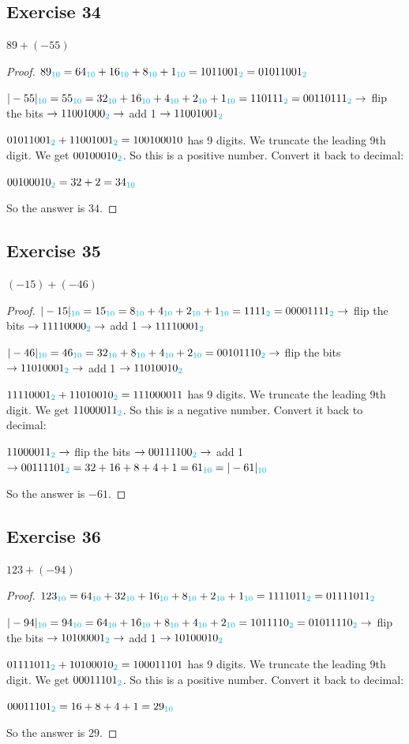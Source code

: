 \documentclass[14pt]{extarticle}
\newcommand{\base}[1]{{\color{cyan}#1}} \newcommand{\da}{\downarrow}
\begin{document}
\subsection{Exercise 34} $89 + (-55)$
\begin{proof} $89_\base{10} = 64_\base{10} + 16_\base{10} + 8_\base{10} +
1_\base{10} = 1011001_\base{2} = 01011001_\base{2}$

$|-55|_\base{10} = 55_\base{10} = 32_\base{10} + 16_\base{10} + 4_\base{10} +
2_\base{10} + 1_\base{10} = 110111_\base{2} = 00110111_\base{2} \to$ flip the
bits $\to 11001000_\base{2} \to$ add 1 $\to 11001001_\base{2}$

$01011001_\base{2} + 11001001_\base{2} = 1 0010 0010$ has 9 digits. We truncate
the leading 9th digit. We get $00100010_\base{2}$. So this is a positive number.
Convert it back to decimal:

$00100010_\base{2} = 32 + 2 = 34_\base{10}$

So the answer is $34$. \end{proof}
\subsection{Exercise 35} $(-15) + (-46)$
\begin{proof} $|-15|_\base{10} = 15_\base{10} = 8_\base{10} + 4_\base{10} +
2_\base{10} + 1_\base{10} = 1111_\base{2} = 00001111_\base{2} \to$ flip the bits
$\to 11110000_\base{2} \to$ add 1 $\to 11110001_\base{2}$

$|-46|_\base{10} = 46_\base{10} = 32_\base{10} + 8_\base{10} + 4_\base{10} +
2_\base{10} = 00101110_\base{2} \to$ flip the bits $\to 11010001_\base{2} \to$
add 1 $\to 11010010_\base{2}$

$11110001_\base{2} + 11010010_\base{2} = 1 1100 0011$ has 9 digits. We truncate
the leading 9th digit. We get $11000011_\base{2}$. So this is a negative number.
Convert it back to decimal:

$11000011_\base{2} \to$ flip the bits $\to 00111100_\base{2} \to$ add 1 $\to
00111101_\base{2} = 32 + 16 + 8 + 4 + 1 = 61_\base{10} = |-61|_\base{10}$

So the answer is $-61$. \end{proof}
\subsection{Exercise 36} $123 + (-94)$
\begin{proof} $123_\base{10} = 64_\base{10} + 32_\base{10} + 16_\base{10} +
8_\base{10} + 2_\base{10} + 1_\base{10} = 1111011_\base{2} = 01111011_\base{2}$

$|-94|_\base{10} = 94_\base{10} = 64_\base{10} + 16_\base{10} + 8_\base{10} +
4_\base{10} + 2_\base{10} = 1011110_\base{2} = 01011110_\base{2} \to$ flip the
bits $\to 10100001_\base{2} \to$ add 1 $\to 10100010_\base{2}$

$01111011_\base{2} + 10100010_\base{2} = 1 0001 1101$ has 9 digits. We truncate
the leading 9th digit. We get $00011101_\base{2}$. So this is a positive number.
Convert it back to decimal:

$00011101_\base{2} = 16 + 8 + 4 + 1 = 29_\base{10}$

So the answer is $29$. \end{proof}
\end{document}
